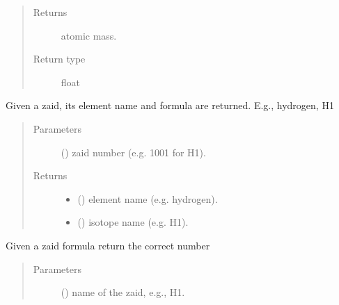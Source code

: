 \documentclass[letterpaper,10pt,english]{sphinxmanual}
\begin{document}
\begin{fulllineitems}
\begin{fulllineitems}
\begin{quote}
\begin{description}
\item[{Returns}] \leavevmode
{} \textendash{} atomic mass.

\item[{Return type}] \leavevmode
float

\end{description}\end{quote}

\end{fulllineitems}


\begin{fulllineitems}
\label{\detokenize{api/initobjects:libmanager.LibManager.get_zaidname}}
Given a zaid, its element name and formula are returned. E.g.,
hydrogen, H1
\begin{quote}\begin{description}
\item[{Parameters}] \leavevmode
{} () \textendash{} zaid number (e.g. 1001 for H1).

\item[{Returns}] \leavevmode
\begin{itemize}
\item {} 
 () \textendash{} element name (e.g. hydrogen).

\item {} 
 () \textendash{} isotope name (e.g. H1).

\end{itemize}


\end{description}\end{quote}

\end{fulllineitems}


\begin{fulllineitems}
\label{\detokenize{api/initobjects:libmanager.LibManager.get_zaidnum}}
Given a zaid formula return the correct number
\begin{quote}\begin{description}
\item[{Parameters}] \leavevmode
{} () \textendash{} name of the zaid, e.g., H1.


\end{description}
\end{quote}
\end{fulllineitems}
\end{fulllineitems}
\end{document}
